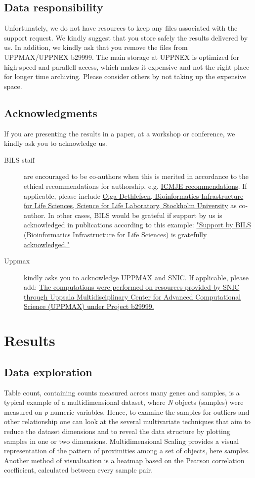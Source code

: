 \documentclass[12pt]{article}
\newcommand{\staff}{Olga Dethlefsen}
\newcommand{\staffWeb}{https://bils.se/staff/olga-dethlefsen/index.html}
\newcommand{\affilations}{Bioinformatics Infrastructure for Life Sciences, Science for Life Laboratory, Stockholm University}
\newcommand{\uppmaxWeb}{http://www.uppmax.uu.se/faq/how-to-acknowledge-uppmax-snic-and-uppnex}
\newcommand{\noUppmax}{b29999}
\begin{document}
\subsection{Data responsibility}
Unfortunately, we do not have resources to keep any files associated with the support request. We kindly suggest that you store safely the results delivered by us. In addition, we kindly ask that you remove the files from UPPMAX/UPPNEX {\noUppmax}. The main storage at UPPNEX is optimized for high-speed and parallell access, which makes it expensive and not the right place for longer time archiving. Please consider others by not taking up the expensive space.
\subsection{Acknowledgments}
If you are presenting the results in a paper, at a workshop or conference, we kindly ask you to acknowledge us.
\begin{description}
\item[BILS staff] are encouraged to be co-authors when this is merited in accordance to the ethical recommendations for authorship, e.g. {\href{http://www.icmje.org/recommendations/}{ICMJE recommendations}}. If applicable, please include {\href{\staffWeb}{{\staff}, \affilations}} as co-author. In other cases, BILS would be grateful if support by us is acknowledged in publications according to this example: \href{https://bils.se/resources/support.html}{"Support by BILS (Bioinformatics Infrastructure for Life Sciences) is gratefully acknowledged."}
\item[Uppmax] kindly asks you to acknowledge UPPMAX and SNIC. If applicable, please add: {\href{\uppmaxWeb}{The computations were performed on resources provided by SNIC through Uppsala Multidisciplinary Center for Advanced Computational Science (UPPMAX) under Project {\noUppmax}.}}
\end{description}

\section{Results}
\subsection{Data exploration}
Table count, containing counts measured across many genes and samples, is a typical example of a multidimensional dataset, where \textit{N} objects (samples) were measured on \textit{p} numeric variables. Hence, to examine the samples for outliers and other relationship one can look at the several multivariate techniques that aim to reduce the dataset dimensions and to reveal the data structure by plotting samples in one or two dimensions. Multidimensional Scaling provides a visual representation of the pattern of proximities among a set of objects, here samples. Another method of visualisation is a heatmap based on the Pearson correlation coefficient, calculated between every sample pair. 
\end{document}
